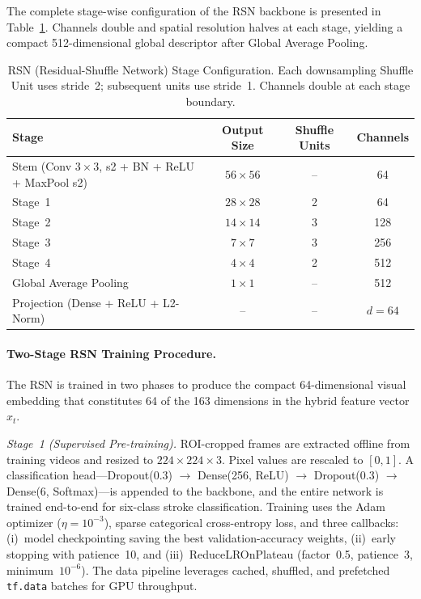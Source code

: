 \documentclass[pdflatex,sn-mathphys-num]{sn-jnl}%
\theoremstyle{thmstyleone}%
\theoremstyle{thmstyletwo}%
\theoremstyle{thmstylethree}%
\begin{document}
The complete stage-wise configuration of the RSN backbone is presented in Table~\ref{tab_rsn_config}. Channels double and spatial resolution halves at each stage, yielding a compact 512-dimensional global descriptor after Global Average Pooling.

\begin{table}[h]
\caption{RSN (Residual-Shuffle Network) Stage Configuration. Each downsampling Shuffle Unit uses stride~2; subsequent units use stride~1. Channels double at each stage boundary.}\label{tab_rsn_config}
\centering
\setlength{\tabcolsep}{5pt}
\renewcommand{\arraystretch}{1.3}
\begin{tabular}{|l|c|c|c|}
\hline
\textbf{Stage} & \textbf{Output Size} & \textbf{Shuffle Units} & \textbf{Channels} \\
\hline
Stem (Conv $3{\times}3$, s2 + BN + ReLU + MaxPool s2) & $56 \times 56$ & -- & 64 \\
\hline
Stage~1 & $28 \times 28$ & 2 & 64 \\
\hline
Stage~2 & $14 \times 14$ & 3 & 128 \\
\hline
Stage~3 & $7 \times 7$ & 3 & 256 \\
\hline
Stage~4 & $4 \times 4$ & 2 & 512 \\
\hline
Global Average Pooling & $1 \times 1$ & -- & 512 \\
\hline
Projection (Dense + ReLU + L2-Norm) & -- & -- & $d{=}64$ \\
\hline
\end{tabular}
\end{table}

\paragraph{Two-Stage RSN Training Procedure.}
The RSN is trained in two phases to produce the compact 64-dimensional visual embedding that constitutes 64 of the 163 dimensions in the hybrid feature vector $x_t$.

\textit{Stage~1 (Supervised Pre-training).}
ROI-cropped frames are extracted offline from training videos and resized to $224 \times 224 \times 3$. Pixel values are rescaled to $[0,1]$. A classification head---Dropout(0.3) $\!\to\!$ Dense(256, ReLU) $\!\to\!$ Dropout(0.3) $\!\to\!$ Dense(6, Softmax)---is appended to the backbone, and the entire network is trained end-to-end for six-class stroke classification. Training uses the Adam optimizer ($\eta = 10^{-3}$), sparse categorical cross-entropy loss, and three callbacks: (i)~model checkpointing saving the best validation-accuracy weights, (ii)~early stopping with patience~10, and (iii)~ReduceLROnPlateau (factor~0.5, patience~3, minimum~$10^{-6}$). The data pipeline leverages cached, shuffled, and prefetched \texttt{tf.data} batches for GPU throughput.
\end{document}
